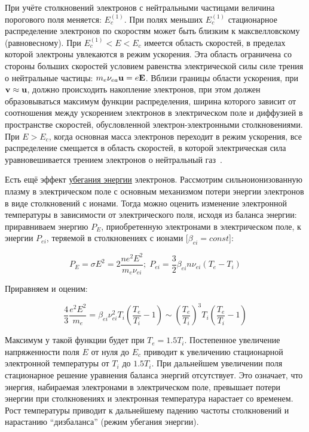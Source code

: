 \documentclass[10pt, a4paper]{article}
\begin{document}
При учёте столкновений электронов с нейтральными частицами величина порогового поля меняется: $E_c^{(1)}$. При полях меньших $E_c^{(1)}$ стационарное распределение электронов по скоростям может быть близким к максвелловскому (равновесному). При $E_c^{(1)}<E<E_c$ имеется область скоростей, в пределах которой электроны увлекаются в режим ускорения. Эта область ограничена со стороны больших скоростей условием равенства электрической силы силе трения о нейтральные частицы: $m_e\nu_{ea}\vb{u}=e\vb{E}$. Вблизи границы области ускорения, при $\vb{v}\approx\vb{u}$, должно происходить накопление электронов, при этом должен образовываться максимум функции распределения, ширина которого зависит от соотношения между ускорением электронов в электрическом поле и диффузией в пространстве скоростей, обусловленной электрон-электронными столкновениями. При $E>E_c$, когда основная масса электронов переходит в режим ускорения, все распределение смещается в область скоростей, в которой электрическая сила уравновешивается трением электронов о нейтральный газ~\cite{golant}.

Есть ещё эффект \uline{убегания энергии} электронов. Рассмотрим сильноионизованную плазму в электрическом поле с основным механизмом потери энергии электронов в виде столкновений с ионами. Тогда можно оценить изменение электронной температуры в зависимости от электрического поля, исходя из баланса энергии: приравниваем энергию $P_E$, приобретенную электронами в электрическом поле, к энергии $P_{ei}$, теряемой в столкновениях с ионами [$\beta_{ei}=const$]:

\begin{equation} \label{eq:runaway_el_balance}
	P_E = \sigma E^2 = 2\frac{ne^2 E^2}{m_e\nu_{ei}};\;P_{ei} = \frac{3}{2}\beta_{ei}n\nu_{ei}(T_e-T_i)
\end{equation}

Приравняем и оценим:

\begin{equation*}
	\frac{4}{3}\frac{e^2E^2}{m_e}=\beta_{ei}\nu_{ei}^2T_i\left(\frac{T_e}{T_i}-1\right) \sim \left(\frac{T_e}{T_i}\right)^3T_i(\frac{T_e}{T_i}-1)
\end{equation*}

Максимум у такой функции будет при $T_e=1.5T_i$. Постепенное увеличение напряженности поля $E$ от нуля до $E_c$ приводит к увеличению стационарной электронной температуры от $T_i$ до $1.5T_i$. При дальнейшем увеличении поля стационарное решение уравнения баланса энергий отсутствует. Это означает, что энергия, набираемая электронами в электрическом поле, превышает потери энергии при столкновениях и электронная температура нарастает со временем. Рост температуры приводит к дальнейшему падению частоты столкновений и нарастанию ``дизбаланса'' (режим убегания энергии).
\end{document}
